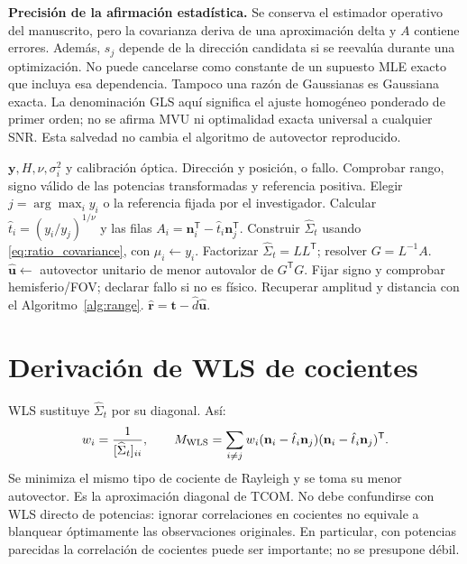 \documentclass[11pt,a4paper]{article}
\begin{document}
\textbf{Precisión de la afirmación estadística.} Se conserva el estimador operativo del manuscrito, pero la covarianza deriva de una aproximación delta y $A$ contiene errores. Además, $s_j$ depende de la dirección candidata si se reevalúa durante una optimización. No puede cancelarse como constante de un supuesto MLE exacto que incluya esa dependencia. Tampoco una razón de Gaussianas es Gaussiana exacta. La denominación GLS aquí significa el ajuste homogéneo ponderado de primer orden; no se afirma MVU ni optimalidad exacta universal a cualquier SNR. Esta salvedad no cambia el algoritmo de autovector reproducido.

\begin{algorithm}[htbp]\caption{GLS adaptado al receptor}\begin{algorithmic}[1]
\Require $\mathbf y,H,\nu,\sigma_i^2$ y calibración óptica.
\Ensure Dirección y posición, o fallo.
\State Comprobar rango, signo válido de las potencias transformadas y referencia positiva.
\State Elegir $j=\arg\max_i y_i$ o la referencia fijada por el investigador.
\State Calcular $\hat t_i=(y_i/y_j)^{1/\nu}$ y las filas $A_i=\mathbf n_i^{\mathsf T}-\hat t_i\mathbf n_j^{\mathsf T}$.
\State Construir $\widehat\Sigma_t$ usando \eqref{eq:ratio_covariance}, con $\mu_i\gets y_i$.
\State Factorizar $\widehat\Sigma_t=LL^{\mathsf T}$; resolver $G=L^{-1}A$.
\State $\hat{\mathbf u}\gets$ autovector unitario de menor autovalor de $G^{\mathsf T}G$.
\State Fijar signo y comprobar hemisferio/FOV; declarar fallo si no es físico.
\State Recuperar amplitud y distancia con el Algoritmo~\ref{alg:range}.
\State \Return $\hat{\mathbf r}=\mathbf t-\hat d\hat{\mathbf u}$.
\end{algorithmic}\end{algorithm}

\section{Derivación de WLS de cocientes}
WLS sustituye $\widehat\Sigma_t$ por su diagonal. Así:
\begin{equation}
 w_i=\frac1{[\widehat\Sigma_t]_{ii}},\qquad
 M_{\rm WLS}=\sum_{i\ne j}w_i(\mathbf n_i-\hat t_i\mathbf n_j)(\mathbf n_i-\hat t_i\mathbf n_j)^{\mathsf T}.
\end{equation}
Se minimiza el mismo tipo de cociente de Rayleigh y se toma su menor autovector. Es la aproximación diagonal de TCOM. No debe confundirse con WLS directo de potencias: ignorar correlaciones en cocientes no equivale a blanquear óptimamente las observaciones originales. En particular, con potencias parecidas la correlación de cocientes puede ser importante; no se presupone débil.
\end{document}
